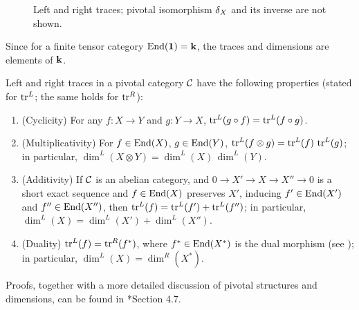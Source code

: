 \begin{figure}[ht]
\qquad


\caption{Left and right traces;
  pivotal isomorphism $\delta_X$ and its inverse are not shown.}\label{f:trace}
\end{figure}
Since for a finite tensor category $\operatorname{End}(\mathbf{1})=\mathbf{k}$, the traces and dimensions
are elements of $\mathbf{k}$.

\begin{lemma}\label{l:trace-properties}
  Left and right traces in a pivotal category $\mathcal{C}$ have the
  following properties \textup{(}stated for $\operatorname{tr}^L$; the
  same holds for $\operatorname{tr}^R$\textup{)}:
  \begin{enumerate}
    \item \textup{(}Cyclicity\textup{)} For any $f\colon X\to Y$ and $g\colon Y\to X$,
      $\operatorname{tr}^L(g\circ f)=\operatorname{tr}^L(f\circ g)$.
    \item \textup{(}Multiplicativity\textup{)} For $f\in \operatorname{End}(X)$, $g\in \operatorname{End}(Y)$,
      $\operatorname{tr}^L(f\otimes g)=\operatorname{tr}^L(f)\,\operatorname{tr}^L(g)$; in particular,
      $\dim^L(X\otimes Y)=\dim^L(X)\,\dim^L(Y)$.
    \item \textup{(}Additivity\textup{)} If $\mathcal{C}$ is an abelian category, and
      $0\to X'\to X\to X''\to 0$ is a short exact sequence
      and $f\in \operatorname{End}(X)$ preserves $X'$,  inducing $f'\in \operatorname{End}(X')$ and $f''\in
      \operatorname{End}(X'')$, then $\operatorname{tr}^L(f)=\operatorname{tr}^L(f')+\operatorname{tr}^L(f'')$; in particular,
      $\dim^L(X)=\dim^L(X')+\dim^L(X'')$.
    \item \textup{(}Duality\textup{)} $\operatorname{tr}^L(f)=\operatorname{tr}^R(f^*)$, where $f^*\in \operatorname{End}(X^*)$ is the
      dual morphism \textup{(}see \textup{)}; in
      particular,
      $\dim^L(X)=\dim^R(X^*)$.
  \end{enumerate}
\end{lemma}
Proofs, together with a more detailed discussion of pivotal structures and
dimensions, can be found in *{Section 4.7}.

